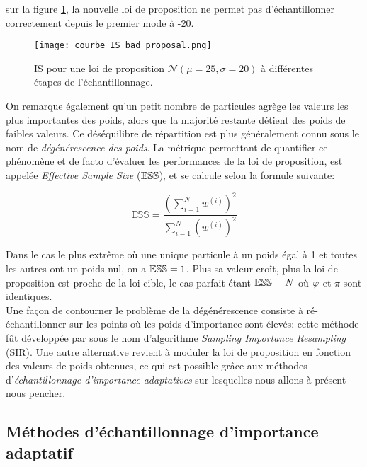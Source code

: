 sur la figure \ref{courbe_IS_bad_proposal}, la nouvelle loi de proposition ne permet pas d'échantillonner correctement depuis le premier mode à -20.

\begin{figure}[h!]
	\centering
	\texttt{[image: courbe\_IS\_bad\_proposal.png]}
	\caption{IS pour une loi de proposition $\mathcal{N}(\mu=25, \sigma=20)$ à différentes étapes de l'échantillonnage.}
	\label{courbe_IS_bad_proposal}
\end{figure}

 On remarque également qu'un petit nombre de particules agrège les valeurs les plus importantes des poids, alors que la majorité restante détient des poids de faibles valeurs. Ce déséquilibre de répartition est plus généralement connu sous le nom de \textit{dégénérescence des poids}. La métrique permettant de quantifier ce phénomène et de facto d'évaluer les performances de la loi de proposition, est appelée \textit{Effective Sample Size} (${\mathbb{ESS}}$), et se calcule selon la formule suivante:

\begin{equation}
\mathbb{ESS} = \dfrac{\left(\sum\limits_{i=1}^N w^{(i)}\right)^2}{\sum\limits_{i=1}^N \left(w^{(i)}\right)^2}
\label{eq_def_ESS}
\end{equation}

Dans le cas le plus extrême où une unique particule à un poids égal à 1 et toutes les autres ont un poids nul, on a ${\mathbb{ESS}} = 1$. Plus sa valeur croît, plus la loi de proposition est proche de la loi cible, le cas parfait étant ${\mathbb{ESS}} = N$ où ${\varphi}$ et $\pi$ sont identiques.\\

Une façon de contourner le problème de la dégénérescence consiste à ré-échantillonner sur les points où les poids d'importance sont élevés: cette méthode fût développée par \cite{Rubin1988} sous le nom d'algorithme \textit{Sampling Importance Resampling} (SIR). Une autre alternative  revient à moduler la loi de proposition en fonction des valeurs de poids obtenues, ce qui est possible grâce aux méthodes d'\textit{échantillonnage d'importance adaptatives} sur lesquelles nous allons à présent nous pencher.\\

\subsection{Méthodes d'échantillonnage d'importance adaptatif}

